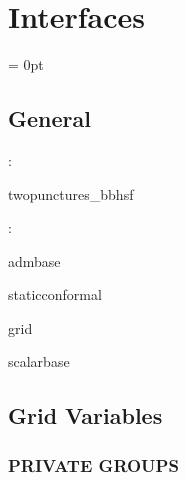 
\section{Interfaces} 


\parskip = 0pt

\vspace{3mm} \subsection*{General}

: 

twopunctures\_bbhsf
\vspace{2mm}

: 

admbase

staticconformal

grid

scalarbase
\vspace{2mm}
\subsection*{Grid Variables}
\vspace{5mm}\subsubsection{PRIVATE GROUPS}

\vspace{5mm}

